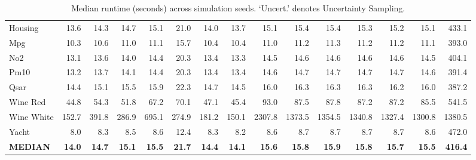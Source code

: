 \begin{table}[htbp]
\begin{tabular}{l rrrrrrrrrrrrrr}
        Housing & 13.6 & 14.3 & 14.7 & 15.1 & 21.0 & 14.0 & 13.7 & 15.1 & 15.4 & 15.4 & 15.3 & 15.2 & 15.1 & 433.1 \\
        Mpg & 10.3 & 10.6 & 11.0 & 11.1 & 15.7 & 10.4 & 10.4 & 11.0 & 11.2 & 11.3 & 11.2 & 11.2 & 11.1 & 393.0 \\
        No2 & 13.1 & 13.6 & 14.0 & 14.4 & 20.3 & 13.4 & 13.3 & 14.5 & 14.6 & 14.6 & 14.6 & 14.6 & 14.5 & 404.1 \\
        Pm10 & 13.2 & 13.7 & 14.1 & 14.4 & 20.3 & 13.4 & 13.4 & 14.6 & 14.7 & 14.7 & 14.7 & 14.7 & 14.6 & 391.4 \\
        Qsar & 14.4 & 15.1 & 15.5 & 15.9 & 22.3 & 14.7 & 14.5 & 16.0 & 16.3 & 16.3 & 16.3 & 16.2 & 16.0 & 387.2 \\
        Wine Red & 44.8 & 54.3 & 51.8 & 67.2 & 70.1 & 47.1 & 45.4 & 93.0 & 87.5 & 87.8 & 87.2 & 87.2 & 85.5 & 541.5 \\
        Wine White & 152.7 & 391.8 & 286.9 & 695.1 & 274.9 & 181.2 & 150.1 & 2307.8 & 1373.5 & 1354.5 & 1340.8 & 1327.4 & 1300.8 & 1380.5 \\
        Yacht & 8.0 & 8.3 & 8.5 & 8.6 & 12.4 & 8.3 & 8.2 & 8.6 & 8.7 & 8.7 & 8.7 & 8.7 & 8.6 & 472.0 \\
        \textbf{MEDIAN} & \textbf{14.0} & \textbf{14.7} & \textbf{15.1} & \textbf{15.5} & \textbf{21.7} & \textbf{14.4} & \textbf{14.1} & \textbf{15.6} & \textbf{15.8} & \textbf{15.9} & \textbf{15.8} & \textbf{15.7} & \textbf{15.5} & \textbf{416.4} \\
        \bottomrule
    \end{tabular}
    \caption{Median runtime (seconds) across simulation seeds. `Uncert.' denotes Uncertainty Sampling.}
    \label{tab:RuntimeComparison}
\end{table}
